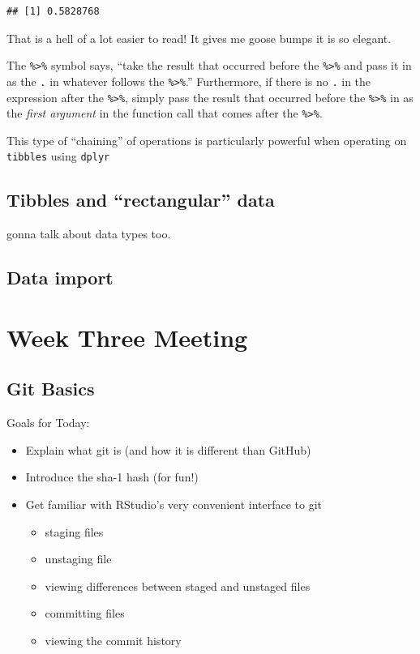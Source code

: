 \documentclass[]{book}
\providecommand{\tightlist}{%
  \setlength{\itemsep}{0pt}\setlength{\parskip}{0pt}}
\theoremstyle{definition}
\theoremstyle{definition}
\theoremstyle{remark}
\begin{document}
\begin{verbatim}
## [1] 0.5828768
\end{verbatim}

That is a hell of a lot easier to read! It gives me goose bumps it is so
elegant.

The \texttt{\%\textgreater{}\%} symbol says, ``take the result that
occurred before the \texttt{\%\textgreater{}\%} and pass it in as the
\texttt{.} in whatever follows the \texttt{\%\textgreater{}\%}.''
Furthermore, if there is no \texttt{.} in the expression after the
\texttt{\%\textgreater{}\%}, simply pass the result that occurred before
the \texttt{\%\textgreater{}\%} in as the \emph{first argument} in the
function call that comes after the \texttt{\%\textgreater{}\%}.

This type of ``chaining'' of operations is particularly powerful when
operating on \texttt{tibbles} using \texttt{dplyr}

\section{\texorpdfstring{Tibbles and ``rectangular''
data}{Tibbles and rectangular data}}\label{tibbles-and-rectangular-data}

gonna talk about data types too.

\section{Data import}\label{data-import}

\chapter{Week Three Meeting}\label{week3}

\section{Git Basics}\label{git-basics}

Goals for Today:

\begin{itemize}
\tightlist
\item
  Explain what git is (and how it is different than GitHub)
\item
  Introduce the sha-1 hash (for fun!)
\item
  Get familiar with RStudio's very convenient interface to git

  \begin{itemize}
  \tightlist
  \item
    staging files
  \item
    unstaging file
  \item
    viewing differences between staged and unstaged files
  \item
    committing files
  \item
    viewing the commit history
  \end{itemize}
\end{itemize}
\end{document}
